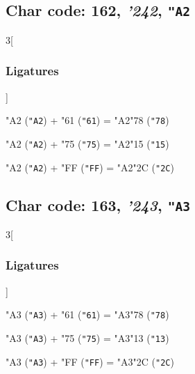 \documentclass{article}
\newlength{\maxcharwidth}
\begin{document}
\subsection{Char code: 162, {\it'242}, {\tt"A2}}
\label{char_162}


\begin{multicols}{3}[\subsubsection{Ligatures}]

{\testfont\char"A2\noboundary} ({\tt"A2}) + {\testfont\char"61\noboundary} ({\tt"61}) = {\testfont\char"A2\noboundary}{\testfont\char"78\noboundary} ({\tt"78}) 

{\testfont\char"A2\noboundary} ({\tt"A2}) + {\testfont\char"75\noboundary} ({\tt"75}) = {\testfont\char"A2\noboundary}{\testfont\char"15\noboundary} ({\tt"15}) 

{\testfont\char"A2\noboundary} ({\tt"A2}) + {\testfont\char"FF\noboundary} ({\tt"FF}) = {\testfont\char"A2\noboundary}{\testfont\char"2C\noboundary} ({\tt"2C}) 

\end{multicols}

\subsection{Char code: 163, {\it'243}, {\tt"A3}}
\label{char_163}


\begin{multicols}{3}[\subsubsection{Ligatures}]

{\testfont\char"A3\noboundary} ({\tt"A3}) + {\testfont\char"61\noboundary} ({\tt"61}) = {\testfont\char"A3\noboundary}{\testfont\char"78\noboundary} ({\tt"78}) 

{\testfont\char"A3\noboundary} ({\tt"A3}) + {\testfont\char"75\noboundary} ({\tt"75}) = {\testfont\char"A3\noboundary}{\testfont\char"13\noboundary} ({\tt"13}) 

{\testfont\char"A3\noboundary} ({\tt"A3}) + {\testfont\char"FF\noboundary} ({\tt"FF}) = {\testfont\char"A3\noboundary}{\testfont\char"2C\noboundary} ({\tt"2C}) 

\end{multicols}
\end{document}
